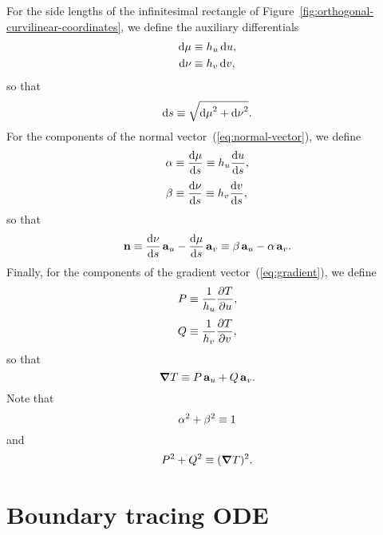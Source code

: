 For the side lengths of the infinitesimal rectangle
of Figure~\ref{fig:orthogonal-curvilinear-coordinates},
we define the auxiliary differentials
\begin{align}
  \td \mu &\ideq \scalefac[u] \td u,
    \label{eq:differential-displacement-u-component} \\
  \td \nu &\ideq \scalefac[v] \td v,
    \label{eq:differential-displacement-v-component}
\end{align}
so that
\begin{equation}
  \mathop{}\!\mathrm{d} s \equiv \sqrt{{\mathop{}\!\mathrm{d} \mu}^2 + {\mathop{}\!\mathrm{d} \nu}^2}.
  \label{eq:differential-arc-length-abbreviated}
\end{equation}
For the components of the normal vector~(\ref{eq:normal-vector}),
we define
\begin{align}
  \alpha &\ideq \tder{\mu}{s} \ideq \scalefac[u] \tder{u}{s},
    \label{eq:tangent-u-component} \\[\tallspace]
  \beta &\ideq \tder{\nu}{s} \ideq \scalefac[v] \tder{v}{s},
    \label{eq:tangent-v-component}
\end{align}
so that
\begin{equation}
  \normalvec
    \ideq \tder{\nu}{s} \basisvec{u} - \tder{\mu}{s} \basisvec{v}
    \ideq \beta \basisvec{u} - \alpha \basisvec{v}.
  \label{eq:normal-vector-abbreviated}
\end{equation}
Finally, for the components of the gradient vector~(\ref{eq:gradient}),
we define
\begin{align}
  P &\ideq \frac{1}{\scalefac[u]} \pder{T}{u},
    \label{eq:gradient-u-component} \\[\tallspace]
  Q &\ideq \frac{1}{\scalefac[v]} \pder{T}{v},
    \label{eq:gradient-v-component}
\end{align}
so that
\begin{equation}
  \mathop{}\!\boldsymbol{\mathbf{\nabla}} T \equiv P \mathop{}\!\boldsymbol{\mathbf{a}}_{u} + Q \mathop{}\!\boldsymbol{\mathbf{a}}_{v}.
  \label{eq:gradient-abbreviated}
\end{equation}
Note that
\begin{equation}
  \alpha^2 + \beta^2 \equiv 1
  \label{eq:tangent-pythagoras}
\end{equation}
and
\begin{equation}
  P^2 + Q^2 \equiv (\mathop{}\!\boldsymbol{\mathbf{\nabla}} T)^2.
  \label{eq:gradient-pythagoras}
\end{equation}

\section{Boundary tracing ODE}
\label{sec:curvilinear.tracing}

